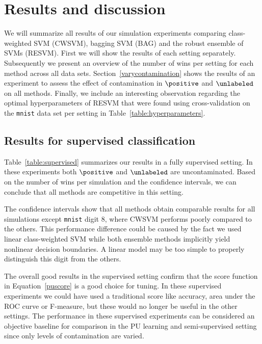 

\newpage
\section{Results and discussion}
We will summarize all results of our simulation experiments comparing class-weighted SVM (CWSVM), bagging SVM (BAG) and the robust ensemble of SVMs (RESVM). First we will show the results of each setting separately. Subsequently we present an overview of the number of wins per setting for each method across all data sets. Section~\ref{varycontamination} shows the results of an experiment to assess the effect of contamination in $\positive$ and $\unlabeled$ on all methods. Finally, we include an interesting observation regarding the optimal hyperparameters of RESVM that were found using cross-validation on the \texttt{mnist} data set per setting in Table~\ref{table:hyperparameters}.
\subsection{Results for supervised classification}
Table~\ref{table:supervised} summarizes our results in a fully supervised setting. In these experiments both $\positive$ and $\unlabeled$ are uncontaminated. Based on the number of wins per simulation and the confidence intervals, we can conclude that all methods are competitive in this setting. 

The confidence intervals show that all methods obtain comparable results for all simulations except \texttt{mnist} digit $8$, where CWSVM performs poorly compared to the others. This performance difference could be caused by the fact we used linear class-weighted SVM while both ensemble methods implicitly yield nonlinear decision boundaries. A linear model may be too simple to properly distinguish this digit from the others.

The overall good results in the supervised setting confirm that the score function in Equation~\eqref{puscore} is a good choice for tuning. In these supervised experiments we could have used a traditional score like accuracy, area under the ROC curve or F-measure, but these would no longer be useful in the other settings. The performance in these supervised experiments can be considered an objective baseline for comparison in the PU learning and semi-supervised setting since only levels of contamination are varied.

